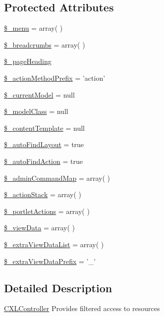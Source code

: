 \subsection*{Protected Attributes}
\begin{DoxyCompactItemize}
\item 
\hyperlink{classCXLController_a4192f529627c76fa7a70ae23b9582516}{\$\_\-menu} = array( )
\item 
\hyperlink{classCXLController_aa29f8061f06b0d1991b405eb2b5817fd}{\$\_\-breadcrumbs} = array( )
\item 
\hyperlink{classCXLController_a4d69ce5758da90c27ff027a2a585b12d}{\$\_\-pageHeading}
\item 
\hyperlink{classCXLController_aa59919f08891da659e63b956bc0eb51b}{\$\_\-actionMethodPrefix} = 'action'
\item 
\hyperlink{classCXLController_abdf2c7ca76e9731f3240034f06c59369}{\$\_\-currentModel} = null
\item 
\hyperlink{classCXLController_a90080dcb26627bf719d96ab99e51f958}{\$\_\-modelClass} = null
\item 
\hyperlink{classCXLController_a60dfb02e8707a7eabb0f0573a607ba6d}{\$\_\-contentTemplate} = null
\item 
\hyperlink{classCXLController_ab2767a4ea7c0e2a4469056d506d354ba}{\$\_\-autoFindLayout} = true
\item 
\hyperlink{classCXLController_a6f28f5590fd179dd9b15a0647118661e}{\$\_\-autoFindAction} = true
\item 
\hyperlink{classCXLController_aec275c56f2c1e8ffe8a5e454a2b695b5}{\$\_\-adminCommandMap} = array( )
\item 
\hyperlink{classCXLController_a1a4bf00b331c163adc5f346e51ecb51f}{\$\_\-actionStack} = array( )
\item 
\hyperlink{classCXLController_a2e9a5f68d4557c2e220a4a8b01cf9b1b}{\$\_\-portletActions} = array( )
\item 
\hyperlink{classCXLController_a32acaa681d9d516f9964704f41590546}{\$\_\-viewData} = array( )
\item 
\hyperlink{classCXLController_a7d16c40c2d533779317b383d69e59ea0}{\$\_\-extraViewDataList} = array( )
\item 
\hyperlink{classCXLController_a41793f2872b496a2d4effc0da5f82a3c}{\$\_\-extraViewDataPrefix} = '\_\-'
\end{DoxyCompactItemize}


\subsection{Detailed Description}
\hyperlink{classCXLController}{CXLController} Provides filtered access to resources 

